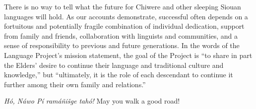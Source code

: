 \documentclass[output=paper]{LSP/langsci}
\begin{document}
There is no way to tell what the future for Chiwere and other sleeping Siouan languages will hold. As our accounts demonstrate, successful  often depends on a fortuitous and potentially fragile combination of individual dedication, support from family and friends, collaboration with linguists and communities, and a sense of responsibility to previous and future generations. In the words of the  Language Project's mission statement, the goal of the Project is ``to share in part the Elders' desire to continue their language and traditional culture and knowledge,'' but ``ultimately, it is the role of each descendant to continue it further among their own family and relations.''

\emph{Hó, Náwo Pí ramáñišge tahó!}  May you walk a good road!

\printbibliography[heading=subbibliography,notkeyword=this]
\end{document}
